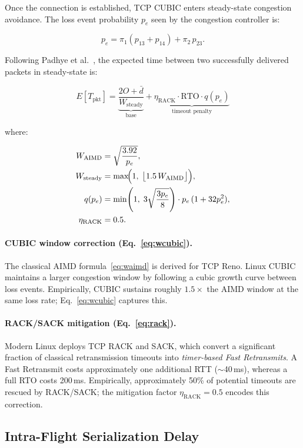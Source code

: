 \documentclass[11pt,letterpaper]{article}
\begin{document}
Once the connection is established, TCP CUBIC enters steady-state congestion
avoidance. The loss event probability $p_e$ seen by the congestion controller
is:

\[
p_e = \pi_1 (p_{13} + p_{14}) + \pi_2\,p_{23}.
\]

Following Padhye et al.~\cite{padhye1998modeling}, the expected time between two
successfully delivered packets in steady-state is:

\[
E[T_{\mathrm{pkt}}] = \underbrace{\frac{2O + \bar{d}}{W_{\mathrm{steady}}}}_{\text{base}} +
\underbrace{\eta_{\mathrm{RACK}} \cdot \mathrm{RTO} \cdot q(p_e)}_{\text{timeout penalty}}
\]

where:

\begin{align}
W_{\mathrm{AIMD}} &= \sqrt{\frac{3.92}{p_e}}, \label{eq:waimd}\\
W_{\mathrm{steady}} &= \max\!\Bigl(1,\;\bigl\lfloor 1.5\,W_{\mathrm{AIMD}}\bigr\rfloor\Bigr), \label{eq:wcubic}\\
q(p_e) &= \min\!\left(1,\;3\sqrt{\frac{3p_e}{8}}\right)\cdot p_e\,(1 + 32p_e^2), \label{eq:timeout_prob}\\
\eta_{\mathrm{RACK}} &= 0.5. \label{eq:rack}
\end{align}

\paragraph{CUBIC window correction (Eq.~\ref{eq:wcubic}).}
The classical AIMD formula~\eqref{eq:waimd} is derived for TCP Reno.  Linux
CUBIC maintains a larger congestion window by following a cubic growth curve
between loss events.  Empirically, CUBIC sustains roughly $1.5\times$ the AIMD
window at the same loss rate; Eq.~\eqref{eq:wcubic} captures this.

\paragraph{RACK/SACK mitigation (Eq.~\ref{eq:rack}).}
Modern Linux deploys TCP RACK and SACK, which convert a significant fraction of
classical retransmission timeouts into \emph{timer-based Fast Retransmits}.
A Fast Retransmit costs approximately one additional RTT ($\sim$40\,ms), whereas
a full RTO costs 200\,ms.  Empirically, approximately 50\% of potential timeouts
are rescued by RACK/SACK; the mitigation factor $\eta_{\mathrm{RACK}} = 0.5$
encodes this correction.

\subsection{Intra-Flight Serialization Delay}
\end{document}

